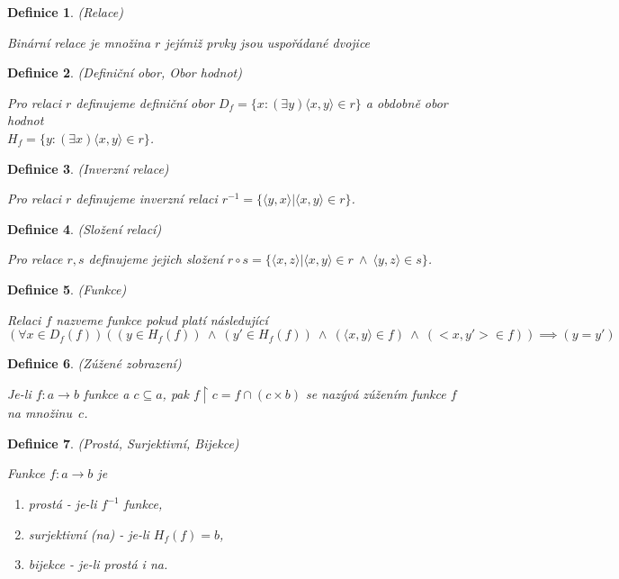 \documentclass[a4paper,10pt,titlepage]{article} \usepackage[utf8]{inputenc}
\newtheorem{define}{Definice}
\begin{document}
\begin{define}
(Relace)

Binární relace je množina $r$ jejímiž prvky jsou uspořádané dvojice
\end{define}

\begin{define}
(Definiční obor, Obor hodnot)

Pro relaci $r$ definujeme definiční obor $D_f = \{x: (\exists y) \langle x , y \rangle  \in r \}$
a obdobně obor hodnot \\ $H_f = \{y: (\exists x) \langle x , y \rangle  \in r \}$.
\end{define}

\begin{define}
(Inverzní relace)

Pro relaci $r$ definujeme inverzní relaci $r^{-1} = \{\langle y , x \rangle  | \langle x , y \rangle  \in r\}$.
\end{define}

\begin{define}
(Složení relací)

Pro relace $r,s$ definujeme jejich složení $r\circ s = \{\langle x , z \rangle  | \langle x , y \rangle  \in r\ \wedge\ \langle y , z \rangle  \in s\}$.
\end{define}

\begin{define}
(Funkce)

Relaci $f$ nazveme funkce pokud platí následující
\[
	(\forall x \in D_f(f)) ((y\in H_f(f)) \ \wedge \ (y'\in H_f(f)) \ \wedge \ (\langle x , y \rangle  \in f)
	\ \wedge \ (<x,y'> \in f)) \implies (y=y')
\]
\end{define}

\begin{define}
(Zúžené zobrazení)

Je-li $f: a\rightarrow b$ funkce a $c\subseteq a$, pak $f \upharpoonright c = f \cap (c\times b)$ se nazývá zúžením 
funkce $f$ na množinu~$c$.
\end{define}

\begin{define}
(Prostá, Surjektivní, Bijekce)

Funkce $f: a\rightarrow b$ je 
\begin{enumerate}
\item prostá - je-li $f^{-1}$ funkce,
\item surjektivní (na) - je-li $H_f(f) = b$,
\item bijekce - je-li prostá i na.
\end{enumerate}
\end{define}
\end{document}
